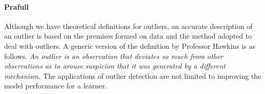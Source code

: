 \documentclass[runningheads]{llncs}
\begin{document}
\paragraph{Prafull} Although we have theoretical definitions for outliers, an accurate description of an outlier is based on the premises formed on data and the method adopted to deal with outliers. A generic version of the definition by Professor Hawkins is as follows. \textit{An outlier is an observation that deviates so much from other observations as to arouse suspicion that it was generated by a different mechanism.
} The applications of outlier detection are not limited to improving the model performance for a learner. 




\end{document}
